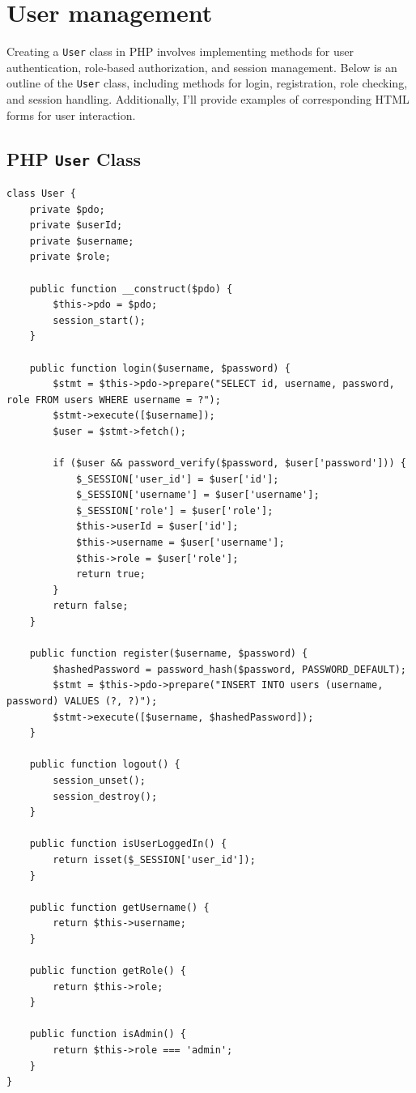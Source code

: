 \documentclass[11pt]{article}
\date{}
\title{}
\begin{document}
\setlength\parindent{10pt}

\section*{User management}
\label{sec:org90866e5}
Creating a \texttt{User} class in PHP involves implementing methods for user
authentication, role-based authorization, and session management. Below
is an outline of the \texttt{User} class, including methods for login,
registration, role checking, and session handling. Additionally, I'll
provide examples of corresponding HTML forms for user interaction.

\subsection*{PHP \texttt{User} Class}
\label{sec:orgd6c866b}
\begin{verbatim}
class User {
    private $pdo;
    private $userId;
    private $username;
    private $role;

    public function __construct($pdo) {
        $this->pdo = $pdo;
        session_start();
    }

    public function login($username, $password) {
        $stmt = $this->pdo->prepare("SELECT id, username, password, role FROM users WHERE username = ?");
        $stmt->execute([$username]);
        $user = $stmt->fetch();

        if ($user && password_verify($password, $user['password'])) {
            $_SESSION['user_id'] = $user['id'];
            $_SESSION['username'] = $user['username'];
            $_SESSION['role'] = $user['role'];
            $this->userId = $user['id'];
            $this->username = $user['username'];
            $this->role = $user['role'];
            return true;
        }
        return false;
    }

    public function register($username, $password) {
        $hashedPassword = password_hash($password, PASSWORD_DEFAULT);
        $stmt = $this->pdo->prepare("INSERT INTO users (username, password) VALUES (?, ?)");
        $stmt->execute([$username, $hashedPassword]);
    }

    public function logout() {
        session_unset();
        session_destroy();
    }

    public function isUserLoggedIn() {
        return isset($_SESSION['user_id']);
    }

    public function getUsername() {
        return $this->username;
    }

    public function getRole() {
        return $this->role;
    }

    public function isAdmin() {
        return $this->role === 'admin';
    }
}
\end{verbatim}
\end{document}
